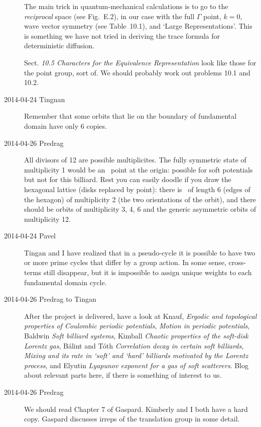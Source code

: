 \begin{description}
The main trick in quantum-mechanical calculations is to go to the
\emph{reciprocal} space (see Fig.~E.2), in our case with the full
$\Gamma$ point, $k=0$, wave vector symmetry (see Table~10.1), and `Large
Representations'. This is something we have not tried in deriving the
trace formula for deterministic diffusion.

Sect. {\em 10.5 Characters for the Equivalence Representation} look
like those for the point group, sort of. We should probably work
out problems 10.1 and 10.2.

\item[2014-04-24 Tingnan]
Remember that some orbits that lie on the boundary of fundamental domain
have only 6 copies.

\item[2014-04-26 Predrag]
All divisors of 12 are possible multiplicites. The fully symmetric state
of multiplicity 1 would be an \eqv\ point at the origin: possible for
soft potentials but not for this billiard. Rest you can easily doodle if
you draw the hexagonal lattice (disks replaced by point): there is \po\
of length 6 (edges of the hexagon) of multiplicity 2 (the two
orientations of the orbit), and there should be orbits of multiplicity 3,
4, 6 and the generic asymmetric orbits of multiplicity 12.

\item[2014-04-24 Pavel]
Tingan and I have realized that in a
pseudo-cycle it is possible to have two or more prime cycles that differ
by a group action. In some sense, cross-terms still disappear, but it is
impossible to assign unique weights to each fundamental domain cycle.

\item[2014-04-26 Predrag to Tingan]
After the project is delivered,
have a look at
Knauf,
{\em Ergodic and topological properties of {Coulombic} periodic potentials},
{\em Motion in periodic potentials},
Baldwin {\em Soft billiard systems},
Kimball
{\em Chaotic properties of the soft-disk {Lorentz} gas},
B\'alint and T\'oth
{\em Correlation decay in certain soft billiards},
{\em Mixing and its rate in `soft' and `hard' billiards
         motivated by the {Lorentz} process},
and
Elyutin
{\em Lyapunov exponent for a gas of soft scatterers}.
Blog about relevant parts here, if there is something of interest
to us.

\item[2014-04-26 Predrag] We should read Chapter 7 of Gaspard.
Kimberly and I both have a hard copy. Gaspard discusses irreps of
the translation group in some detail.


\end{description}
